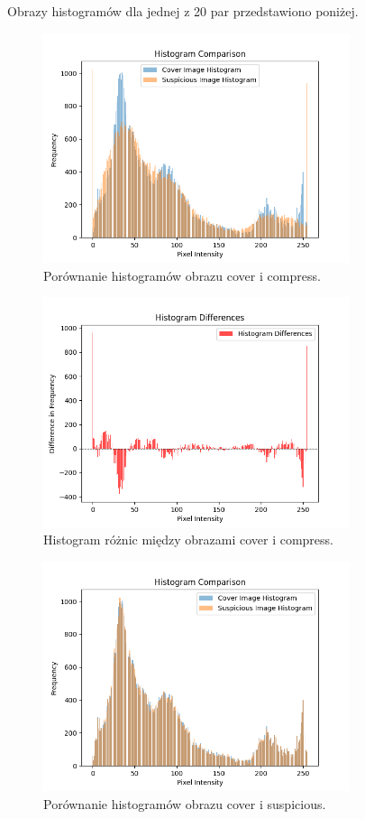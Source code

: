 Obrazy histogramów dla jednej z 20 par przedstawiono poniżej.
\begin{figure}[h!]
    \centering
    \includegraphics[width=0.8\textwidth]{./img/compress_histogram.png}
    \caption{Porównanie histogramów obrazu cover i compress.}
    \label{fig:histogram_comparison}
\end{figure}

\begin{figure}[h!]
    \centering
    \includegraphics[width=0.8\textwidth]{./img/compress_diff_histogram.png}
    \caption{Histogram różnic między obrazami cover i compress.}
    \label{fig:histogram_diff}

\end{figure}\begin{figure}[h!]
    \centering
    \includegraphics[width=0.8\textwidth]{./img/cover_histogram.png}
    \caption{Porównanie histogramów obrazu cover i suspicious.}
    \label{fig:histogram_comparison}
\end{figure}

